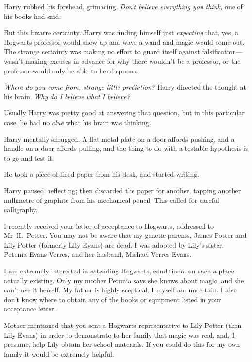 Harry rubbed his forehead, grimacing. \emph{Don’t believe everything you think,} one of his books had said.

But this bizarre certainty…Harry was finding himself just
\emph{expecting} that, yes, a Hogwarts professor would show up and wave a wand and magic would come out. The strange certainty was making no effort to guard itself against falsification—wasn’t making excuses in advance for why there wouldn’t be a professor, or the professor would only be able to bend spoons.

\emph{Where do you come from, strange little prediction?} Harry directed the thought at his brain. \emph{Why do I believe what I believe?}

Usually Harry was pretty good at answering that question, but in this particular case, he had no \emph{clue} what his brain was thinking.

Harry mentally shrugged. A flat metal plate on a door affords pushing, and a handle on a door affords pulling, and the thing to do with a testable hypothesis is to go and test it.

He took a piece of lined paper from his desk, and started writing.

\begin{writtenNote}
\end{writtenNote}

Harry paused, reflecting; then discarded the paper for another, tapping another millimetre of graphite from his mechanical pencil. This called for careful calligraphy.

\begin{writtenNote}


I recently received your letter of acceptance to Hogwarts, addressed to Mr~H.~Potter. You may not be aware that my genetic parents, James Potter and Lily Potter (formerly Lily Evans) are dead. I was adopted by Lily’s sister, Petunia Evans-Verres, and her husband, Michael Verres-Evans.

I am extremely interested in attending Hogwarts, conditional on such a place actually existing. Only my mother Petunia says she knows about magic, and she can’t use it herself. My father is highly sceptical. I myself am uncertain. I also don’t know where to obtain any of the books or equipment listed in your acceptance letter.

Mother mentioned that you sent a Hogwarts representative to Lily Potter (then Lily Evans) in order to demonstrate to her family that magic was real, and, I presume, help Lily obtain her school materials. If you could do this for my own family it would be extremely helpful.

\end{writtenNote}

